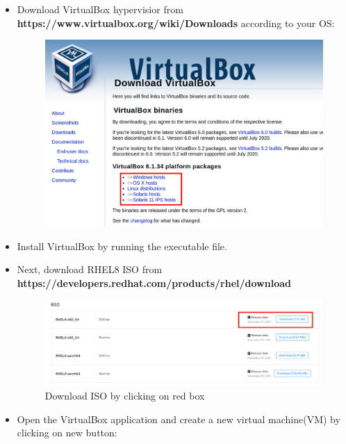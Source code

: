 \setlength{\columnsep}{3pt}
\begin{flushleft}

\begin{itemize}
	\item Download VirtualBox hypervisior from \textbf{https://www.virtualbox.org/wiki/Downloads} 
	according to your OS:
	\begin{figure}[h!]
		\centering
		\includegraphics[scale=.25]{content/chapter18/images/vm.png}
	\end{figure}		

	\item Install VirtualBox by running the executable file.	
	
	\item Next, download RHEL8 ISO from \textbf{https://developers.redhat.com/products/rhel/download}
	
	\begin{figure}[h!]
		\centering
		\includegraphics[scale=.2]{content/chapter18/images/iso.png}
		\caption{Download ISO by clicking on red box}
		\label{new}
	\end{figure}		

	\newpage
	\item Open the VirtualBox application and create a new virtual machine(VM) by clicking on new button:
	

\end{itemize}
\end{flushleft}
